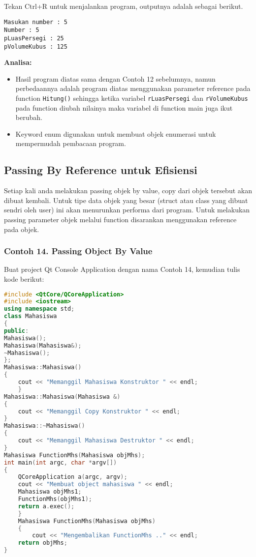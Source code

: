 Tekan Ctrl+R untuk menjalankan program, outputnya adalah sebagai
berikut.

\begin{verbatim}
Masukan number : 5
Number : 5
pLuasPersegi : 25
pVolumeKubus : 125
\end{verbatim}

\textbf{Analisa:}

\begin{itemize}
\tightlist
\item
  Hasil program diatas sama dengan Contoh 12 sebelumnya, namun
  perbedaannya adalah program diatas menggunakan parameter reference
  pada function \texttt{Hitung()} sehingga ketika variabel
  \texttt{rLuasPersegi} dan \texttt{rVolumeKubus} pada function diubah
  nilainya maka variabel di function main juga ikut berubah.
\item
  Keyword enum digunakan untuk membuat objek enumerasi untuk mempermudah
  pembacaan program.
\end{itemize}

\subsection{Passing By Reference untuk
Efisiensi}\label{passing-by-reference-untuk-efisiensi}

Setiap kali anda melakukan passing objek by value, copy dari objek
tersebut akan dibuat kembali. Untuk tipe data objek yang besar (struct
atau class yang dibuat sendri oleh user) ini akan menurunkan performa
dari program. Untuk melakukan passing parameter objek melalui function
disarankan menggunakan reference pada objek.

\subsubsection*{Contoh 14. Passing Object By Value}

Buat project Qt Console Application dengan nama Contoh 14, kemudian
tulis kode berikut:

\begin{lstlisting}[language=c++]
#include <QtCore/QCoreApplication>
#include <iostream>
using namespace std;
class Mahasiswa
{
public:
Mahasiswa();
Mahasiswa(Mahasiswa&);
~Mahasiswa();
};
Mahasiswa::Mahasiswa()
{
    cout << "Memanggil Mahasiswa Konstruktor " << endl;
    }
Mahasiswa::Mahasiswa(Mahasiswa &)
{
    cout << "Memanggil Copy Konstruktor " << endl;
}
Mahasiswa::~Mahasiswa()
{
    cout << "Memanggil Mahasiswa Destruktor " << endl;
}
Mahasiswa FunctionMhs(Mahasiswa objMhs);
int main(int argc, char *argv[])
{
    QCoreApplication a(argc, argv);
    cout << "Membuat object mahasiswa " << endl;
    Mahasiswa objMhs1;
    FunctionMhs(objMhs1);
    return a.exec();
    }
    Mahasiswa FunctionMhs(Mahasiswa objMhs)
    {
        cout << "Mengembalikan FunctionMhs .." << endl;
    return objMhs;
}
\end{lstlisting}

